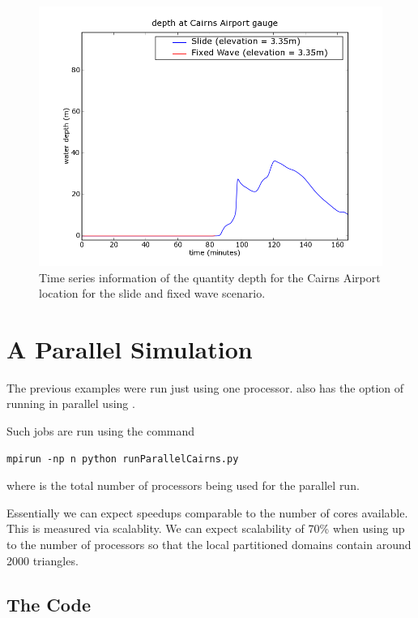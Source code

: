 \documentclass{manual}
\begin{document}
\begin{figure}[htp]
  \centerline{\includegraphics[scale=0.5]{graphics/gaugeCairnsAirportdepth.png}}
  \caption{Time series information of the quantity depth for the Cairns Airport
           location for the slide and fixed wave scenario.}
  \label{fig:airportboth}
\end{figure}


\section{A Parallel Simulation}

The previous examples were run just using one processor. \anuga also has the option of running in parallel using \mpi.

Such jobs are run using the command

\begin{verbatim}
mpirun -np n python runParallelCairns.py
\end{verbatim}
where  is the total number of processors being used for the parallel run. 

Essentially we can expect speedups comparable to the number of cores available. This is measured via scalablity. We can expect scalability of 70\% when using up to the number of processors so that the local partitioned domains contain around 2000 triangles. 

\subsection{The Code}
\end{document}
